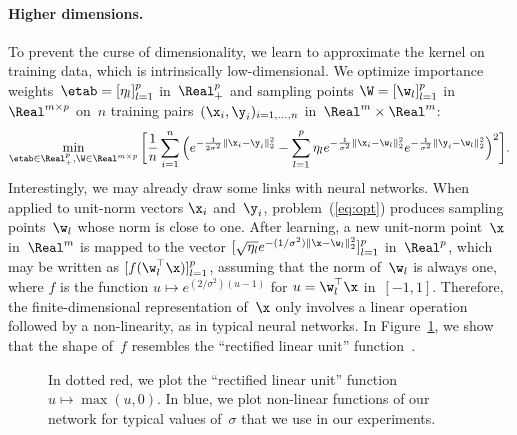\vs
\paragraph{Higher dimensions.}
To prevent the curse of dimensionality, we learn to
approximate the kernel on training data, which is intrinsically
low-dimensional. We optimize importance weights~$\etab=[\eta_l]_{l=1}^p$
in~$\Real_+^p$ and sampling points $\W = [\w_l]_{l=1}^p$ in~$\Real^{m \times
p}$ on~$n$ training pairs~$(\x_i,\y_i)_{i=1,\ldots,n}$ in~$\Real^m \times
\Real^m$:
\begin{equation}
   \min_{\etab \in \Real_+^p, \W \in \Real^{m \times p}} \bigg[ \frac{1}{n} \sum_{i=1}^n \Big(e^{-\frac{1}{2\sigma^2}\|\x_i-\y_i\|_2^2} - \sum_{l=1}^p \eta_l e^{-\frac{1}{\sigma^2}\|\x_i-\w_l\|_2^2} e^{-\frac{1}{\sigma^2}\|\y_i-\w_l\|_2^2}\Big)^2   \bigg]. \label{eq:opt}
\end{equation}
Interestingly, we may already draw some links with neural networks. When
applied to unit-norm vectors $\x_i$ and~$\y_i$,
problem~(\ref{eq:opt}) produces sampling points~$\w_l$ whose norm is close to
one. After learning, a new unit-norm point~$\x$ in~$\Real^m$ is mapped to the
vector $[\sqrt{\eta_l} e^{-({1}/{\sigma^2})\|\x-\w_l\|_2^2}]_{l=1}^p$ in~$\Real^p$,
which may be written as $[f(\w_l^\top \x)]_{l=1}^p$, assuming that the norm of~$\w_l$ is always one, where $f$ is the
function $u \mapsto e^{(2/\sigma^2)(u -1)}$ for
$u=\w_l^\top\x$ in~$[-1, 1]$.  
Therefore, the finite-dimensional representation of~$\x$ only involves a linear
operation followed by a non-linearity, as in typical neural networks.  In
Figure~\ref{fig:relu}, we show that the shape of~$f$ resembles the ``rectified
linear unit'' function~\cite{wan2013}.
\begin{figure}[hbtp]
   \centering
   \vspace*{-0.3cm}
   \caption{In dotted red, we plot the ``rectified linear unit'' function $u \mapsto \max(u,0)$. In blue, we plot non-linear functions of our network for typical values of~$\sigma$ that we use in our experiments.}\label{fig:relu}
\end{figure}

